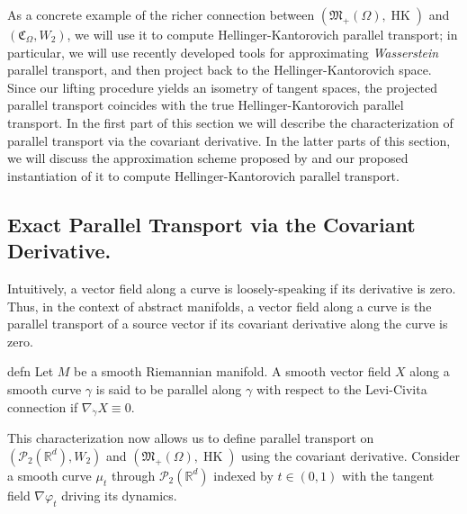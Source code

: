 \documentclass[11pt]{article}
\newcommand{\man}{M}
\newcommand{\HK}{\operatorname{HK}}
\begin{document}
As a concrete example of the richer connection between $(\mathfrak{M}_+(\Omega), \HK)$ and $(\mathfrak{C}_\Omega, W_2)$, we will use it to compute Hellinger-Kantorovich parallel transport; in particular, we will use recently developed tools for approximating \textit{Wasserstein} parallel transport, and then project back to the Hellinger-Kantorovich space. Since our lifting procedure yields an isometry of tangent spaces, the projected parallel transport coincides with the true Hellinger-Kantorovich parallel transport.  In the first part of this section we will describe the characterization of parallel transport via the covariant derivative. In the latter parts of this section, we will discuss the approximation scheme proposed by \citet{saidi2026wassersteinparalleltransportpredicting} and our proposed instantiation of it to compute Hellinger-Kantorovich parallel transport.   

\subsection{Exact Parallel Transport via the Covariant Derivative.} 
Intuitively, a vector field along a curve is  loosely-speaking if its derivative is zero. Thus, in the context of abstract manifolds, a vector field along a curve is the parallel transport of a source vector if its covariant derivative along the curve is zero.
\begin{restatable}{defn}{} \label{parallel transport on general manifolds}
    Let $\man$ be a smooth Riemannian manifold. A smooth vector field $X$ along a smooth curve $\gamma$ is said to be parallel along $\gamma$ with respect to the Levi-Civita connection if $\nabla_{\dot \gamma}X \equiv 0$.
\end{restatable}
This characterization now allows us to define parallel transport on $(\mathcal{P}_2(\mathbb{R}^d), W_2)$ and $(\mathfrak{M}_+(\Omega), \HK)$ using the covariant derivative. Consider a smooth curve $\mu_t$ through $\mathcal{P}_2(\mathbb{R}^d)$ indexed by $t \in (0, 1)$ with the tangent field $\nabla \varphi_t$ driving its dynamics. 
\end{document}
